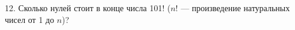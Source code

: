 12. Сколько нулей стоит в конце числа 101! ($n!$ --- произведение натуральных чисел от 1 до $n$)?\\
